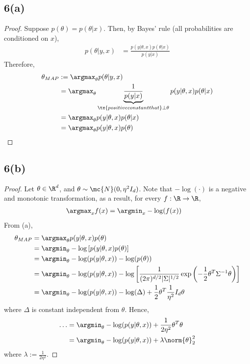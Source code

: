 \documentclass[11pt]{article}
\begin{document}
	\subsection{6(a)}
	\begin{proof}
		Suppose $p(\theta) = p(\theta|x)$. Then, by Bayes' rule (all probabilities are conditioned on $x$),
		\begin{align}
			p(\theta|y, x) &= \frac{p(y|\theta, x) p(\theta|x)}{p(y|x)}
		\end{align}
		Therefore,
		\begin{align}
			\theta_{MAP} &:= \argmax_\theta p(\theta|y, x) \\
			&= \argmax_\theta \underbrace{\frac{1}{p(y|x)}}_{\tx{positive constant that } \perp \theta} p(y|\theta, x) p(\theta|x) \\
			&= \argmax_\theta p(y|\theta, x) p(\theta|x) \\
			&= \argmax_\theta p(y|\theta, x) p(\theta)
		\end{align}
	\end{proof}
	
	\newpage
	\subsection{6(b)}
	\begin{proof}
		Let $\theta \in \R^d$, and $\theta \sim \mc{N}(0, \eta^2 I_d)$.
		Note that $-\log(\cdot)$ is a negative and monotonic transformation, as a result, for every $f: \R \to \R$,
		\begin{align}
			\argmax_x f(x) &= \argmin_x - \log(f(x))
		\end{align}
		From (a),
		\begin{align}
			\theta_{MAP} &= \argmax_\theta p(y|\theta, x) p(\theta) \\
			&= \argmin_\theta - \log \left[p(y|\theta, x) p(\theta) \right] \\
			&= \argmin_\theta - \log(p(y|\theta, x)) - \log(p(\theta)) \\
			&= \argmin_\theta - \log(p(y|\theta, x)) - \log \left[
			\frac{1}{(2\pi)^{d/2} |\Sigma|^{1/2}} \exp \left (
			- \frac{1}{2} \theta^T \Sigma^{-1} \theta
			\right )
			\right ] \\
			&= \argmin_\theta - \log(p(y|\theta, x)) - \log (\Delta) + \frac{1}{2} \theta^T \frac{1}{\eta^2} I_d \theta
		\end{align}
		where $\Delta$ is constant independent from $\theta$. Hence,
		\begin{align}
			\dots &= \argmin_\theta - \log(p(y|\theta, x)) + \frac{1}{2 \eta^2} \theta^T \theta \\
			&= \argmin_\theta - \log(p(y|\theta, x)) + \lambda \norm{\theta}_2^2
		\end{align}
		where $\lambda := \frac{1}{2 \eta^2}$.
	\end{proof}
	
\end{document}
